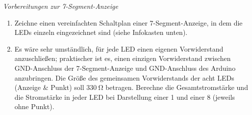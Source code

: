 \bigskip
\begin{aufgabe} \emph{Vorbereitungen zur 7-Segment-Anzeige}
	\begin{enumerate}[label=\alph*), itemsep=0ex,parsep=0mm]
		\item Zeichne einen vereinfachten Schaltplan einer 7-Segment-Anzeige, %
		in dem die LEDs einzeln eingezeichnet sind (siehe Infokasten unten).
		\item Es wäre sehr umständlich, für jede LED einen eigenen Vorwiderstand anzuschließen; praktischer ist es, einen einzigen Vorwiderstand zwischen GND-Anschluss der 7-Segment-Anzeige und GND-Anschluss des Arduino anzubringen. Die Größe des gemeinsamen Vorwiderstands der acht LEDs (Anzeige \& Punkt) soll $\SI{330}{\ohm}$ betragen. Berechne die Gesamtstromstärke und die Stromstärke in jeder LED bei Darstellung einer 1 und einer 8 (jeweils ohne Punkt).
	\end{enumerate}
\end{aufgabe}

